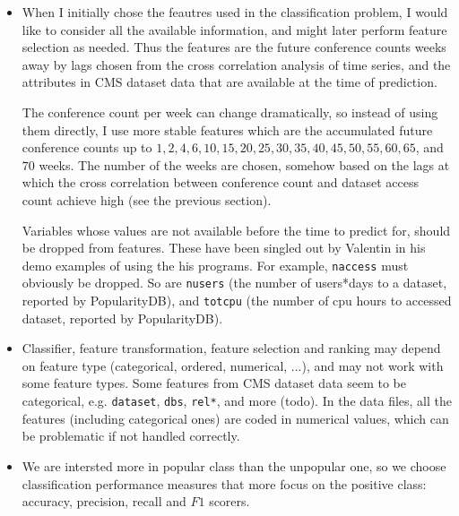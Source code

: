 \documentclass[final, 12pt]{elsarticle}
\begin{document}
\begin{itemize}

 \item
When I initially chose the feautres used in the classification problem, I would like to consider all the available information, and might later perform feature selection as needed. Thus the features are the future conference counts weeks away by lags chosen from the cross correlation analysis of time series, and the attributes in CMS dataset data that are available at the time of prediction.

The conference count per week can change dramatically, so instead of using them directly, I use more stable features which are the accumulated future conference counts up to $1, 2, 4, 6, 10, 15, 20, 25, 30, 35, 40, 45, 50, 55, 60, 65$, and $70$ weeks. The number of the weeks are chosen, somehow based on the lags at which the cross correlation between conference count and dataset access count achieve high (see the previous section).

Variables whose values are not available before the time to predict for, should be dropped from features.
These have been singled out by Valentin in his demo examples of using the his programs.
For example,
\verb|naccess| must obviously be dropped.
So are \verb|nusers| (the number of users*days to a dataset, reported by PopularityDB), and \verb|totcpu| (the number of cpu hours to accessed dataset, reported by PopularityDB).

\item
Classifier, feature transformation, feature selection and ranking may depend on feature type (categorical, ordered, numerical, ...), and may not work with some feature types.
Some features from CMS dataset data seem to be categorical, e.g. \verb|dataset|, \verb|dbs|, \verb|rel*|, and more (todo).
In the data files, all the features (including categorical ones) are coded in numerical values, which can be problematic if not handled correctly.

\item
We are intersted more in popular class than the unpopular one, so we choose classification performance measures that more focus on the positive class:  accuracy, precision, recall and $F1$ scorers.

  
\end{itemize}
\end{document}
